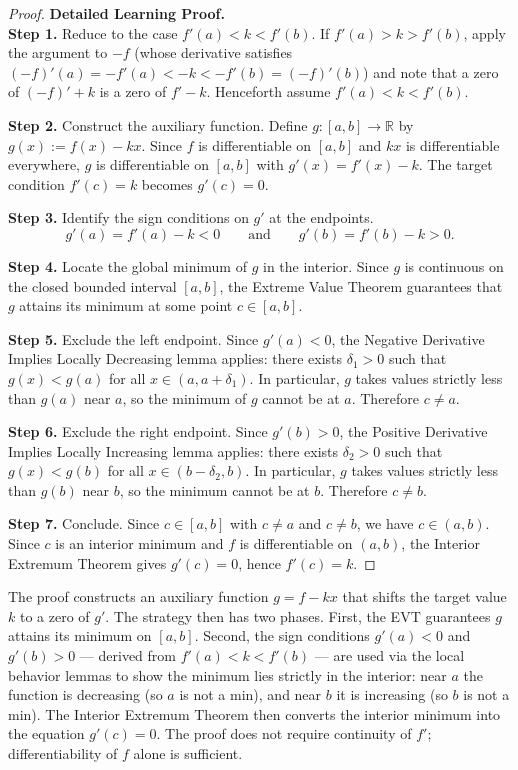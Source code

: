 \begin{proof}
\textbf{Detailed Learning Proof.}~\\

\textbf{Step 1.} Reduce to the case $f'(a) < k < f'(b)$. If $f'(a) > k > f'(b)$, apply the argument to $-f$ (whose derivative satisfies $(-f)'(a) = -f'(a) < -k < -f'(b) = (-f)'(b)$) and note that a zero of $(-f)' + k$ is a zero of $f' - k$. Henceforth assume $f'(a) < k < f'(b)$.

\textbf{Step 2.} Construct the auxiliary function. Define $g : [a,b] \to \mathbb{R}$ by $g(x) := f(x) - kx$. Since $f$ is differentiable on $[a,b]$ and $kx$ is differentiable everywhere, $g$ is differentiable on $[a,b]$ with $g'(x) = f'(x) - k$. The target condition $f'(c) = k$ becomes $g'(c) = 0$.

\textbf{Step 3.} Identify the sign conditions on $g'$ at the endpoints.
\[
g'(a) = f'(a) - k < 0 \qquad \text{and} \qquad g'(b) = f'(b) - k > 0.
\]

\textbf{Step 4.} Locate the global minimum of $g$ in the interior. Since $g$ is continuous on the closed bounded interval $[a,b]$, the Extreme Value Theorem guarantees that $g$ attains its minimum at some point $c \in [a,b]$.

\textbf{Step 5.} Exclude the left endpoint. Since $g'(a) < 0$, the Negative Derivative Implies Locally Decreasing lemma applies: there exists $\delta_1 > 0$ such that $g(x) < g(a)$ for all $x \in (a, a+\delta_1)$. In particular, $g$ takes values strictly less than $g(a)$ near $a$, so the minimum of $g$ cannot be at $a$. Therefore $c \neq a$.

\textbf{Step 6.} Exclude the right endpoint. Since $g'(b) > 0$, the Positive Derivative Implies Locally Increasing lemma applies: there exists $\delta_2 > 0$ such that $g(x) < g(b)$ for all $x \in (b-\delta_2, b)$. In particular, $g$ takes values strictly less than $g(b)$ near $b$, so the minimum cannot be at $b$. Therefore $c \neq b$.

\textbf{Step 7.} Conclude. Since $c \in [a,b]$ with $c \neq a$ and $c \neq b$, we have $c \in (a,b)$. Since $c$ is an interior minimum and $f$ is differentiable on $(a,b)$, the Interior Extremum Theorem gives $g'(c) = 0$, hence $f'(c) = k$.
\end{proof}

\begin{remark*}
The proof constructs an auxiliary function $g = f - kx$ that shifts the target value $k$ to a zero of $g'$. The strategy then has two phases. First, the EVT guarantees $g$ attains its minimum on $[a,b]$. Second, the sign conditions $g'(a) < 0$ and $g'(b) > 0$ --- derived from $f'(a) < k < f'(b)$ --- are used via the local behavior lemmas to show the minimum lies strictly in the interior: near $a$ the function is decreasing (so $a$ is not a min), and near $b$ it is increasing (so $b$ is not a min). The Interior Extremum Theorem then converts the interior minimum into the equation $g'(c) = 0$. The proof does not require continuity of $f'$; differentiability of $f$ alone is sufficient.
\end{remark*}

